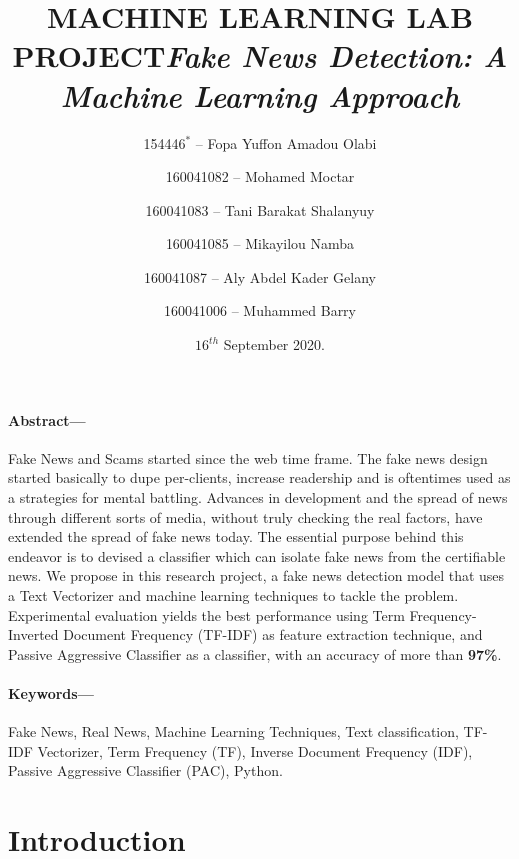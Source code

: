 \documentclass[11.5pt]{article}
\title{\textbf{MACHINE LEARNING LAB PROJECT}\hr \textit{\textbf{Fake News Detection: A Machine Learning Approach}}\hr}
\author[1]{154446$^*$ -- Fopa Yuffon Amadou Olabi}
\author[2]{160041082 -- Mohamed Moctar}
\author[3]{160041083 -- Tani Barakat Shalanyuy}
\author[4]{160041085 -- Mikayilou Namba}
\author[5]{160041087 -- Aly Abdel Kader Gelany}
\author[6]{160041006 -- Muhammed Barry}
\affil[1]{$^{,2,3,4,5,6}$ Department of Computer Science and Engineering, Islamic University of Technology\hr}
\date{$16^{th}$ September 2020.}
\begin{document}
\maketitle
\begin{multicols}{2}

\paragraph{Abstract---}
Fake News and Scams started since the web time frame. The fake news design started basically to dupe per-clients, increase readership and is oftentimes used as a strategies for mental battling. Advances in development and the spread of news through different sorts of media, without truly checking the real factors, have extended the spread of fake news today. The essential purpose behind this endeavor is to devised a classifier which can isolate fake news from the certifiable news.
\newline
We propose in this research project, a fake news detection model that uses a Text Vectorizer and machine learning techniques to tackle the problem.
Experimental evaluation yields the best performance using Term Frequency-Inverted Document Frequency (TF-IDF) as feature extraction technique, and Passive Aggressive Classifier as a classifier, with an accuracy of more than \textbf{97\%}. 

\paragraph{Keywords---}
Fake News, Real News, Machine Learning Techniques, Text classification, TF-IDF Vectorizer, Term Frequency (TF), Inverse Document Frequency (IDF), Passive Aggressive Classifier (PAC), Python.

\section{Introduction}

\end{multicols}
\end{document}
